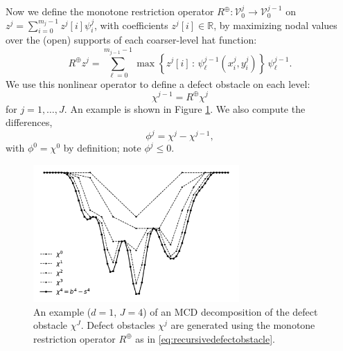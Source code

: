 \documentclass[letterpaper,final,12pt,reqno]{amsart}
\theoremstyle{claim}
\newcommand{\RR}{\mathbb{R}}
\newcommand{\mR}{R^{\bm{\oplus}}}
\numberwithin{equation}{section}
\numberwithin{figure}{section}
\numberwithin{table}{section}
\numberwithin{theorem}{section}
\begin{document}
Now we define the monotone restriction operator $\mR : \mathcal{V}_0^j \to \mathcal{V}_0^{j-1}$ \cite{GraeserKornhuber2009} on $z^j = \sum_{i=0}^{m_j-1} z^j[i] \psi_i^j$, with coefficients $z^j[i]\in\RR$, by maximizing nodal values over the (open) supports of each coarser-level hat function:
\begin{equation}
\mR z^j = \sum_{\ell=0}^{m_{j-1}-1} \max\left\{z^j[i] \,:\,\psi_\ell^{j-1}(x_i^j,y_i^j) \right\}\,\psi_\ell^{j-1}.  \label{eq:monotonerestriction}
\end{equation}
We use this nonlinear operator to define a defect obstacle on each level:
\begin{equation}
\chi^{j-1} = \mR \chi^j  \label{eq:recursivedefectobstacle}
\end{equation}
for $j=1,\dots,J$.  An example is shown in Figure \ref{fig:decompclassical}.  We also compute the differences,
\begin{equation}
\phi^j = \chi^j - \chi^{j-1},  \label{eq:downobstacles}
\end{equation}
with $\phi^0=\chi^0$ by definition; note $\phi^j\le 0$.

\begin{figure}[t]
\begin{center}
\includegraphics[width=0.7\textwidth]{fixfigs/decompclassical.pdf}
\end{center}
\caption{An example ($d=1$, $J=4$) of an MCD decomposition of the defect obstacle $\chi^J$.  Defect obstacles $\chi^j$ are generated using the monotone restriction operator $\mR$ as in \eqref{eq:recursivedefectobstacle}.}
\label{fig:decompclassical}
\end{figure}
\end{document}
